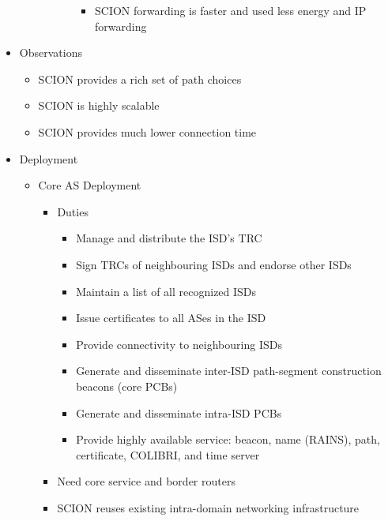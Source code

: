 \begin{itemize}
\begin{itemize}
\begin{itemize}
\begin{itemize}
\begin{itemize}
                                    \item SCION forwarding is faster and used less energy and IP forwarding
                                \end{itemize}
                        \end{itemize}
                \end{itemize}
        \end{itemize}
    \item Observations
        \begin{itemize}
            \item SCION provides a rich set of path choices
            \item SCION is highly scalable
            \item SCION provides much lower connection time
        \end{itemize}
    \item Deployment
        \begin{itemize}
            \item Core AS Deployment
                \begin{itemize}
                    \item Duties
                        \begin{itemize}
                            \item Manage and distribute the ISD's TRC
                            \item Sign TRCs of neighbouring ISDs and endorse other ISDs
                            \item Maintain a list of all recognized ISDs
                            \item Issue certificates to all ASes in the ISD
                            \item Provide connectivity to neighbouring ISDs
                            \item Generate and disseminate inter-ISD path-segment construction beacons (core PCBs)
                            \item Generate and disseminate intra-ISD PCBs
                            \item Provide highly available service: beacon, name (RAINS), path, certificate, COLIBRI, and time server
                        \end{itemize}
                    \item Need core service and border routers
                    \item SCION reuses existing intra-domain networking infrastructure

\end{itemize}
\end{itemize}
\end{itemize}
